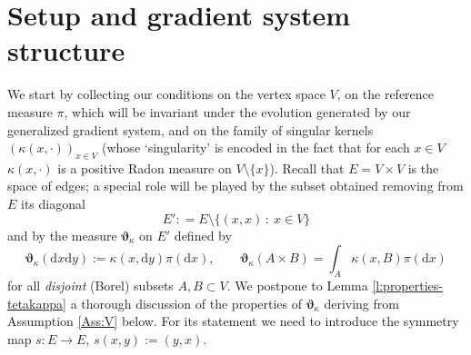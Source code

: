 \documentclass[11pt,reqno]{amsart}
\numberwithin{equation}{section}
\newcommand{\dd}{\mathrm{d}}
\theoremstyle{definition}
\def\dd{\mathrm{d}}
\newcommand{\teta}{\boldsymbol \vartheta}
\newcommand{\tetapi}{\boldsymbol{\teta}_{\kappa}}
\newcommand{\Ed}{{E'}}
\newcommand{\RCR}{\color{magenta}}
\newcommand{\EEE}{\color{black}}
\numberwithin{equation}{section}
\begin{document}
\section{Setup and gradient system structure}
\label{s:3}
We start by collecting our conditions on the  vertex space $V$,
 on the reference measure $\pi$, which will be invariant under the evolution
generated by our generalized gradient system, and on the family of singular kernels $(\kappa(x,\cdot))_{x\in V} $ (whose `singularity' is  encoded in the fact that 
for each $x\in V$ $\kappa(x,\cdot)$ is a positive Radon measure on $V\setminus \{x\}$). 
Recall that $E =V \times V$ is the space of edges; 
a special role will be played by the subset obtained removing from $E$ its diagonal
\[
\Ed: = E \setminus \{ (x,x)\, : \ x \in V\}
\] 
and by the measure  $\tetapi$ on $\Ed$ defined by 
\begin{equation}
\label{teta-coupling}
	\tetapi(\dd x\dd y) := \kappa(x,\dd y)\pi(\dd x), \qquad \tetapi(A{\times}B) = \int_{A} \kappa (x,B) \pi(\dd x) 
\end{equation}
for all \emph{disjoint} (Borel) subsets $A,B \subset V$.
\RCR We postpone to Lemma \ref{l:properties-tetakappa} a thorough discussion of the properties of 
$\tetapi$ deriving from Assumption \ref{Ass:V} below. For its statement  we need to introduce  \EEE
the symmetry map
$s: E \to E$, 
 $s(x,y):=(y,x)$. 
\end{document}

